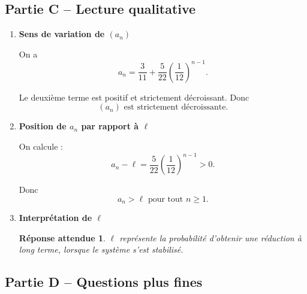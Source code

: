 \documentclass[11pt,a4paper]{article}
\newtheorem*{reponseattendue}{Réponse attendue}
\begin{document}
\subsection*{Partie C -- Lecture qualitative}

\begin{enumerate}[label=\textbf{2.\arabic*}, resume, leftmargin=1.6em]

\item \textbf{Sens de variation de \((a_n)\)}

On a
\[
a_n=\frac3{11}+\frac5{22}\left(\frac1{12}\right)^{n-1}.
\]

Le deuxième terme est positif et strictement décroissant. Donc
\[
\boxed{(a_n)\text{ est strictement décroissante.}}
\]

\item \textbf{Position de \(a_n\) par rapport à \(\ell\)}

On calcule :
\[
a_n-\ell=\frac5{22}\left(\frac1{12}\right)^{n-1}>0.
\]

Donc
\[
\boxed{a_n>\ell \text{ pour tout } n\ge 1.}
\]

\item \textbf{Interprétation de \(\ell\)}

\begin{reponseattendue}
\(\ell\) représente la probabilité d’obtenir une réduction à long terme, lorsque le système s’est stabilisé.
\end{reponseattendue}

\end{enumerate}

\subsection*{Partie D -- Questions plus fines}
\end{document}
